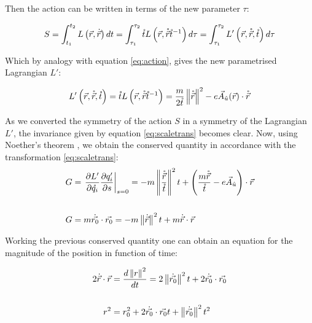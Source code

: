 Then the action can be written in terms of the new parameter $\tau$:

\begin{equation*}
S = \int_{t_1}^{t_2}L\left( \vec{r},\dot{\vec{r}} \right)dt = \int_{\tau_1}^{\tau_2}\mathring{t}L\left( \vec{r},\mathring{\vec{r}}{\mathring{t}}^{-1} \right)d\tau                                                                    = \int_{\tau_1}^{\tau_2}L'\left( \vec{r},\mathring{\vec{r}},\mathring{t} \right)d\tau
\label{eq:actiontau}
\end{equation*}

Which by analogy with equation \eqref{eq:action}, gives the new parametrised Lagrangian $L'$:

\begin{equation*}
L'\left( \vec{r},\mathring{\vec{r}},\mathring{t} \right) = \mathring{t}L\left( \vec{r},\mathring{\vec{r}}{\mathring{t}}^{-1} \right) = \frac{m}{2\mathring{t}}\left\lVert \mathring{\vec{r}} \right\rVert^2 - e\vec{A}_{\hat{u}}(\vec{r})\cdot\mathring{\vec{r}}
\end{equation*}

As we converted the symmetry of the action $S$ in a symmetry of the Lagrangian $L'$, the invariance given by  equation \eqref{eq:scaletrans} becomes clear. Now, using Noether's theorem \cite{scheck}, we obtain the conserved quantity in accordance with the transformation \eqref{eq:scaletrans}: \\

\begin{align*}
G &= \left. \frac{\partial L'}{\partial \mathring{q_i}} \frac{\partial q'_i}{\partial s} \right|_{s=0} = -m\left\lVert \frac{\mathring{\vec{r}}}{\mathring{t}} \right\rVert^2t + \left( \frac{m\mathring{\vec{r}}}{\mathring{t}} - e\vec{A}_{\hat{u}} \right)\cdot \vec{r}\\
\\
G &= m\dot{\vec{r_0}}\cdot\vec{r_0} = -m\left\lVert \dot{\vec{r}} \right\rVert^2t + m\dot{\vec{r}}\cdot\vec{r} \\
\end{align*}

Working the previous conserved quantity one can obtain an equation for the magnitude of the position in function of time:

\begin{align*}
\nonumber
 2\dot{\vec{r}}\cdot\vec{r} &= \frac{d\left\lVert r \right\rVert^2}{dt} = 2\left\lVert \dot{\vec{r_0}} \right\rVert^2t + 2\dot{\vec{r_0}}\cdot\vec{r_0}\\
 \\ 
 r^2 &= r_0^2 +2\dot{\vec{r_0}}\cdot\vec{r_0}t +\left\lVert \dot{\vec{r_0}} \right\rVert^2t^2  \\
\end{align*}

